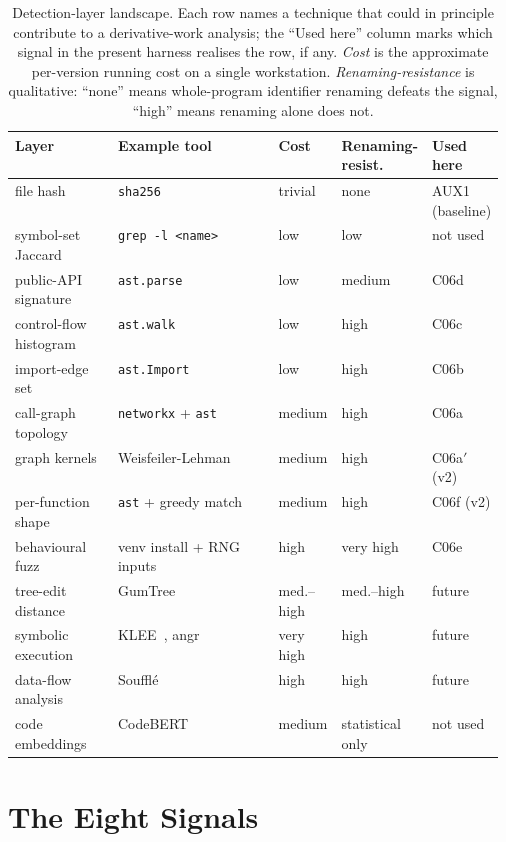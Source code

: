 \documentclass[11pt,letterpaper]{article}
\begin{document}
\begin{table}[h]
\small
\centering
\caption{Detection-layer landscape. Each row names a technique that
could in principle contribute to a derivative-work analysis; the
``Used here'' column marks which signal in the present harness
realises the row, if any. \emph{Cost} is the approximate per-version
running cost on a single workstation. \emph{Renaming-resistance} is
qualitative: ``none'' means whole-program identifier renaming
defeats the signal, ``high'' means renaming alone does not.}
\label{tab:layers}
\begin{tabularx}{\linewidth}{@{}p{0.21\linewidth}Xp{0.10\linewidth}p{0.13\linewidth}p{0.13\linewidth}@{}}
\toprule
Layer & Example tool & Cost & Renaming-resist. & Used here \\
\midrule
file hash & \texttt{sha256} & trivial & none & AUX1 (baseline) \\
symbol-set Jaccard & \texttt{grep -l <name>} & low & low & not used \\
public-API signature & \texttt{ast.parse} & low & medium & C06d \\
control-flow histogram & \texttt{ast.walk} & low & high & C06c \\
import-edge set & \texttt{ast.Import} & low & high & C06b \\
call-graph topology & \texttt{networkx} + \texttt{ast} & medium & high & C06a \\
graph kernels & Weisfeiler-Lehman~\cite{shervashidze2011weisfeiler} & medium & high & C06a$'$ (v2) \\
per-function shape & \texttt{ast} + greedy match & medium & high & C06f (v2) \\
behavioural fuzz & venv install + RNG inputs & high & very high & C06e \\
tree-edit distance & GumTree~\cite{falleri2014gumtree} & med.--high & med.--high & future \\
symbolic execution & KLEE~\cite{cadar2008klee}, angr~\cite{shoshitaishvili2016sok} & very high & high & future \\
data-flow analysis & Soufflé~\cite{jordan2016souffle} & high & high & future \\
code embeddings & CodeBERT~\cite{feng2020codebert} & medium & statistical only & not used \\
\bottomrule
\end{tabularx}
\end{table}

\section{The Eight Signals}
\label{sec:signals}
\end{document}
